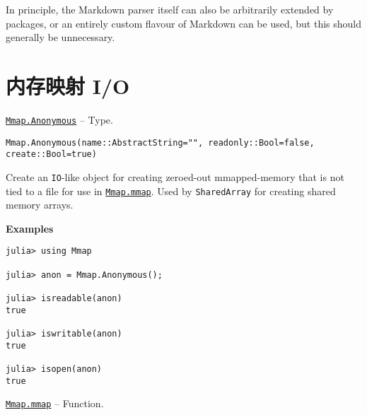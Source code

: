 In principle, the Markdown parser itself can also be arbitrarily extended by packages, or an entirely custom flavour of Markdown can be used, but this should generally be unnecessary.



\hypertarget{1528138219436012362}{}


\chapter{内存映射 I/O}


\hypertarget{8426825172443272214}{}
\hyperlink{8426825172443272214}{\texttt{Mmap.Anonymous}}  -- {Type.}

\begin{adjustwidth}{2em}{0pt}


\begin{verbatim}
Mmap.Anonymous(name::AbstractString="", readonly::Bool=false, create::Bool=true)
\end{verbatim}

Create an \texttt{IO}-like object for creating zeroed-out mmapped-memory that is not tied to a file for use in \hyperlink{1028440884226576897}{\texttt{Mmap.mmap}}. Used by \texttt{SharedArray} for creating shared memory arrays.

\textbf{Examples}


\begin{verbatim}
julia> using Mmap

julia> anon = Mmap.Anonymous();

julia> isreadable(anon)
true

julia> iswritable(anon)
true

julia> isopen(anon)
true
\end{verbatim}



\end{adjustwidth}
\hypertarget{1028440884226576897}{}
\hyperlink{1028440884226576897}{\texttt{Mmap.mmap}}  -- {Function.}

